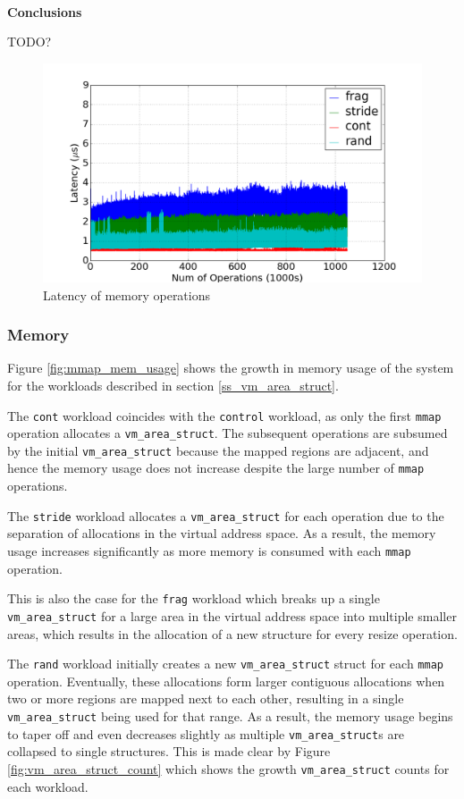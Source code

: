 \documentclass[twocolumn,11pt]{article}
\begin{document}
~\\ \textbf{Conclusions}

TODO?

\begin{figure}[t]
    \includegraphics[width=\columnwidth]{figures/mmap_latency}
    \caption{Latency of memory operations}
    \label{fig:mmap_latency}
\end{figure}

\subsubsection{Memory}
Figure \ref{fig:mmap_mem_usage} shows the growth in memory usage of the system
for the workloads described in section \ref{ss_vm_area_struct}. 

The
\texttt{cont} workload coincides with the \texttt{control} workload, as only the
first \texttt{mmap} operation allocates a \texttt{vm\_area\_struct}. The subsequent
operations are subsumed by the initial \texttt{vm\_area\_struct} because the mapped
regions are adjacent, and hence the memory usage does not increase despite the
large number of \texttt{mmap} operations.  

The \texttt{stride} workload allocates a
\texttt{vm\_area\_struct} for each operation due to the separation of
allocations in the virtual address space. As a result, the memory usage
increases significantly as more memory is consumed with each \texttt{mmap} operation.

This is also the case for the \texttt{frag} workload which breaks up a single
\texttt{vm\_area\_struct} for a large area in the virtual address space into
multiple smaller areas, which results in the allocation of a new structure for
every resize operation. 

The \texttt{rand} workload initially creates a new
\texttt{vm\_area\_struct} struct for each \texttt{mmap} operation. Eventually, these
allocations form larger contiguous allocations when two or more regions are
mapped next to each other, resulting in a single \texttt{vm\_area\_struct} being
used for that range. As a result, the memory usage begins to taper off and
even decreases slightly as multiple \texttt{vm\_area\_struct}s are collapsed to
single structures. This is made clear by Figure \ref{fig:vm_area_struct_count}
which shows the growth \texttt{vm\_area\_struct} counts for each workload.
\end{document}
